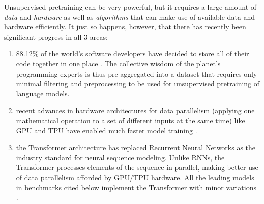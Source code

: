 Unsupervised pretraining can be very powerful, but it requires a large amount of \emph{data} and \emph{hardware} as well as \emph{algorithms} that can make use of available data and hardware efficiently. 
It just so happens, however, that there has recently been significant progress in all 3 areas:
\begin{enumerate}
    \item 88.12\% of the world's software developers have decided to store all of their code together in one place \cite{GithubMarketShare}. The collective wisdom of the planet's programming experts is thus pre-aggregated into a dataset that requires only minimal filtering and preprocessing \cite{kocetkovStack3TB2022} to be used for unsupervised pretraining of language models.
    \item recent advances in hardware architectures for data parallelism (applying one mathematical operation to a set of different inputs at the same time) like GPU \cite{dallyEvolutionGraphicsProcessing2021} and TPU \cite{jouppiMotivationEvaluationFirst2018} have enabled much faster model training \cite{wangBenchmarkingTPUGPU2019}. 
    \item the Transformer architecture \cite{vaswaniAttentionAllYou2023} has replaced Recurrent Neural Networks \cite{hochreiterLongShorttermMemory1997,choPropertiesNeuralMachine2014} as the industry standard for neural sequence modeling. Unlike RNNs, the Transformer processes elements of the sequence in parallel, making better use of data parallelism afforded by GPU/TPU hardware. All the leading models in benchmarks cited below implement the Transformer with minor variations \cite{raffelExploringLimitsTransfer2023, wangGrokkedTransformersAre2024, geipingCrammingTrainingLanguage2022, liuBetterFewShotFinetuning2023, liuSwinTransformerV22022, rabeSelfattentionDoesNot2022, soPrimerSearchingEfficient2022, sunLengthExtrapolatableTransformer2022, xieResiDualTransformerDual2023, burtsevMemoryTransformer2021a, dingCogViewMasteringTexttoImage2021, dingERNIEDocRetrospectiveLongDocument2021, henryQueryKeyNormalizationTransformers2020, heRealFormerTransformerLikes2021, huangAttentionAttentionImage2019, luUnderstandingImprovingTransformer2019, nguyenTransformersTearsImproving2019, parisottoStabilizingTransformersReinforcement2019, PathwaysLanguageModel, pressImprovingTransformerModels2020, pressTRAINSHORTTEST2022, shazeerFastTransformerDecoding2019, shazeerGLUVariantsImprove2020, shazeerTalkingHeadsAttention2020, shleiferNormFormerImprovedTransformer2021, sukhbaatarAugmentingSelfattentionPersistent2019a, wangCrossFormerVersatileVision2021, zhangRootMeanSquare2019, zhaoExplicitSparseTransformer2019, ZhiXuJiXingDaiMaGaiJinTransformerZiZhuYiLiJiZhiJiHuBuZengJiaJiSuanLiang}.
\end{enumerate}

